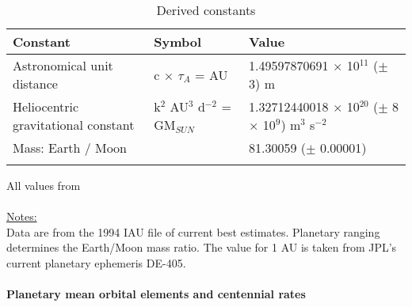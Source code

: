 \documentclass[Orbiter User Manual.tex]{subfiles}
\begin{document}
	\begin{longtable}{ |p{}|p{}|p{}| }
	\hline\rule{0pt}{2ex}
	\textbf{Constant} & \textbf{Symbol} & \textbf{Value}\\
	\hline\rule{0pt}{2ex}
	Astronomical unit distance & c $\times$ $\tau_{A}$ = AU & 1.49597870691 $\times$ 10$^{11}$ ($\pm$ 3) m\\
	\hline\rule{0pt}{2ex}
	Heliocentric gravitational constant & k$^{2}$ AU$^{3}$ d$^{-2}$ = GM$_{SUN}$ & 1.32712440018 $\times$ 10$^{20}$ ($\pm$ 8 $\times$ 10$^{9}$) m$^{3}$ s$^{-2}$\\
	\hline\rule{0pt}{2ex}
	Mass: Earth / Moon & & 81.30059 ($\pm$ 0.00001)\\
	\hline
	\caption{Derived constants}
	\end{longtable}

\noindent
All values from \cite{standish1995}\\
\\
\underline{Notes:}\\
Data are from the 1994 IAU file of current best estimates. Planetary ranging determines the Earth/Moon mass ratio. The value for 1 AU is taken from JPL's current planetary ephemeris DE-405.\\
\\
\textbf{Planetary mean orbital elements and centennial rates}
\end{document}
